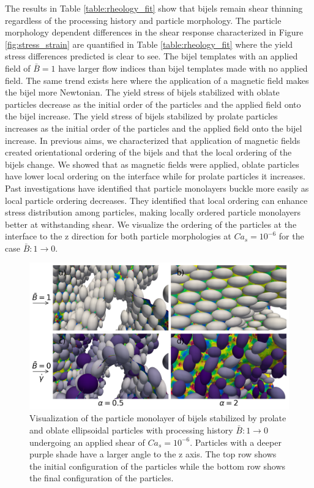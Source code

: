 The results in Table \ref{table:rheology_fit} show that bijels remain shear thinning regardless of the processing history and particle morphology.
The particle morphology dependent differences in the shear response characterized in Figure \ref{fig:stress_strain} are quantified in Table \ref{table:rheology_fit}
where the yield stress differences predicted is clear to see. The bijel templates with an applied field of $\bar{B} = 1$ have larger flow indices
than bijel templates made with no applied field. The same trend exists here where the application of a magnetic field makes the bijel more Newtonian.
The yield stress of bijels stabilized with oblate particles decrease as the initial order of the particles and the applied field onto the bijel increase. 
The yield stress of bijels stabilized by prolate particles increases as the initial order of the particles and the applied field onto the bijel increase. In previous aims, we 
characterized that application of magnetic fields created orientational ordering of the bijels and that the local ordering of the bijels change. We  
showed that as magnetic fields were applied, oblate particles have lower local ordering on the interface while for prolate particles it increases.
Past investigations have identified that particle monolayers buckle more easily as local particle ordering decreases. \cite{prakash_buckling_2024} 
They identified that local ordering can enhance stress distribution among particles, making locally ordered particle monolayers better at withstanding shear.
We visualize the ordering of the particles at the interface to the z direction for both particle morphologies at $Ca_s = 10^{-6}$ for the 
case $\bar{B}: 1 \rightarrow 0$.

\begin{figure} 
    \centering 
    \includegraphics[scale=0.4]{../figures/results/paper3/tz_concat_startB-1_endB-0.png} 
    \caption{Visualization of the particle monolayer of bijels stabilized by prolate and oblate ellipsoidal particles with processing history $\bar{B}: 1 \rightarrow 0$
             undergoing an applied shear of $Ca_s = 10^{-6}$. Particles with a deeper purple shade have a larger angle to the z axis. The top row shows the initial 
             configuration of the particles while the bottom row shows the final configuration of the particles. } 
    \label{fig:particle_viz_tz} 
\end{figure}

